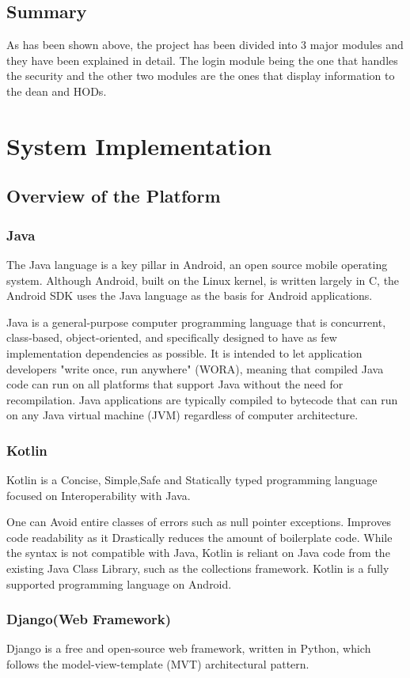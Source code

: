 \documentclass[BTech]{srmuthesis}
\begin{document}
\section{Summary}
As has been shown above, the project has been divided into 3 major modules and they have been explained in detail. The login module being the one that handles the security and the other two modules are the ones that display information to the dean and HODs.
\chapter{System Implementation}
\section{Overview of the Platform}
\subsection{Java}
The Java language is a key pillar in Android, an open source mobile operating system. Although Android, built on the Linux kernel, is written largely in C, the Android SDK uses the Java language as the basis for Android applications.

Java is a general-purpose computer programming language that is concurrent, class-based, object-oriented, and specifically designed to have as few implementation dependencies as possible. It is intended to let application developers "write once, run anywhere" (WORA), meaning that compiled Java code can run on all platforms that support Java without the need for recompilation. Java applications are typically compiled to bytecode that can run on any Java virtual machine (\ac{JVM}) regardless of computer architecture. 
\subsection{Kotlin}
Kotlin is a Concise, Simple,Safe and Statically typed programming language focused on Interoperability with Java. 

One can Avoid entire classes of errors such as null pointer exceptions. Improves code readability as it Drastically reduces the amount of boilerplate code. While the syntax is not compatible with Java, Kotlin is reliant on Java code from the existing Java Class Library, such as the collections framework. 
Kotlin is a fully supported programming language on Android.
\subsection{Django(Web Framework)}
Django is a free and open-source web framework, written in Python, which follows the model-view-template (MVT) architectural pattern.
\end{document}
